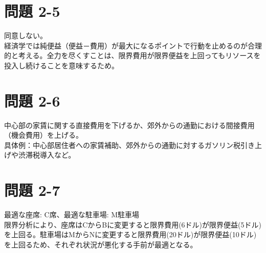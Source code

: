 \documentclass[paper=a4, fontsize=10pt]{jlreq}
\begin{document}
\section*{問題 2-5}
同意しない。\\
経済学では純便益（便益－費用）が最大になるポイントで行動を止めるのが合理的と考える。全力を尽くすことは、限界費用が限界便益を上回ってもリソースを投入し続けることを意味するため。

\section*{問題 2-6}
中心部の家賃に関する直接費用を下げるか、郊外からの通勤における間接費用（機会費用）を上げる。\\
具体例：中心部居住者への家賃補助、郊外からの通勤に対するガソリン税引き上げや渋滞税導入など。

\section*{問題 2-7}
最適な座席: C席、最適な駐車場: M駐車場\\
限界分析により、座席はCからBに変更すると限界費用(6ドル)が限界便益(5ドル)を上回る。駐車場はMからNに変更すると限界費用(20ドル)が限界便益(10ドル)を上回るため、それぞれ状況が悪化する手前が最適となる。
\end{document}
